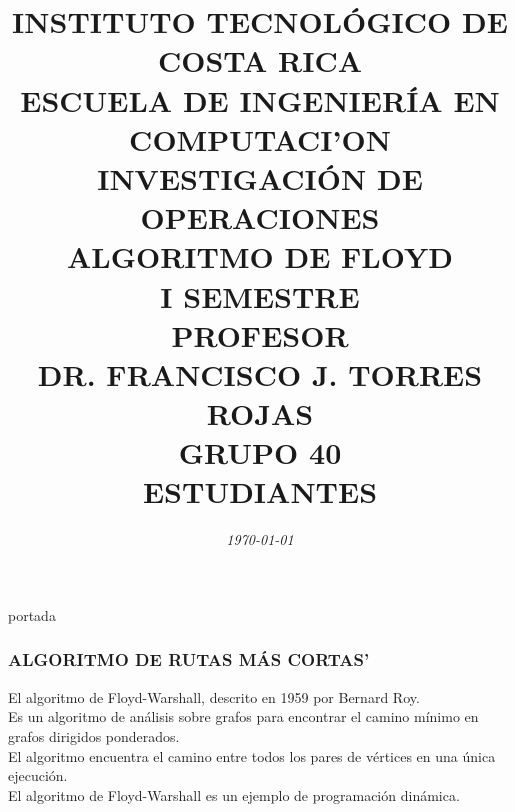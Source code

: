 \documentclass[10]{beamer}
\title{{\color{WHITE} \large \textbf{INSTITUTO TECNOL\'OGICO DE COSTA RICA}} \\ \vspace{0.02cm} 
{\color{WHITE} \large \textbf{ESCUELA DE INGENIER\'IA EN COMPUTACI'ON }} \\ \vspace{0.02cm} 
{\color{WHITE} \large \textbf{INVESTIGACI\'ON DE OPERACIONES  }} \\ \vspace{0.02cm} 
{\color{WHITE} \large \textbf{ALGORITMO DE FLOYD }} \\ \vspace{0.02cm} 
{\color{WHITE} \large \textbf{I SEMESTRE  }}\\ \vspace{0.02cm}
{\color{WHITE} \large \textbf{PROFESOR}} \\ \vspace{0.02cm}
{\color{WHITE} \large DR. FRANCISCO J. TORRES ROJAS  } \\ \vspace{0.02cm}
{\color{WHITE} \large \textbf{GRUPO 40}} \\ \vspace{0.01cm}
{\color{WHITE} \large \textbf{ESTUDIANTES} }}
\date{\em \color{WHITE} \today}
\begin{document}
\begin{frame}
\color{white}
\titlepage portada
\end{frame} 
\begin{frame}
\color{white}
\frametitle{ALGORITMO DE RUTAS M\'AS CORTAS'}
El algoritmo de Floyd-Warshall, descrito en 1959 por Bernard Roy.
\\Es un algoritmo de an\'alisis sobre grafos para encontrar el camino m\'inimo en grafos dirigidos ponderados.
\\El algoritmo encuentra el camino entre todos los pares de v\'ertices en una \'unica ejecuci\'on.
\\ El algoritmo de Floyd-Warshall es un ejemplo de programaci\'on din\'amica.
\end{frame} 
\end{document}
